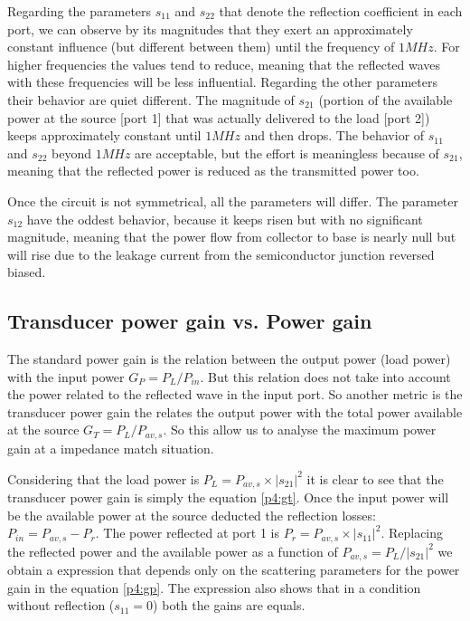 Regarding the parameters $s_{11}$ and $s_{22}$ that denote the reflection coefficient in each port, we can observe by its magnitudes that they exert an approximately constant influence (but different between them) until the frequency of $1 MHz$. For higher frequencies the values tend to reduce, meaning that the reflected waves with these frequencies will be less influential. Regarding the other parameters their behavior are quiet different. The magnitude of $s_{21}$ (portion of the available power at the source [port 1] that was actually delivered to the load [port 2]) keeps approximately constant until $1 MHz$ and then drops. The behavior of $s_{11}$ and $s_{22}$ beyond $1 MHz$ are acceptable, but the effort is meaningless because of $s_{21}$, meaning that the reflected power is reduced as the transmitted power too. 

Once the circuit is not symmetrical, all the parameters will differ. The parameter $s_{12}$ have the oddest behavior, because it keeps risen but with no significant magnitude, meaning that the power flow from collector to base is nearly null but will rise due to the leakage current from the semiconductor junction reversed biased.

\subsection{Transducer power gain vs. Power gain}

The standard power gain is the relation between the output power (load power) with the input power $G_P = P_L/P_{in}$. But this relation does not take into account the power related to the reflected wave in the input port. So another metric is the transducer power gain the relates the output power with the total power available at the source $G_T = P_L/P_{av,s}$. So this allow us to analyse the maximum power gain at a impedance match situation.

Considering that the load power is $P_L = P_{av,s} \times |s_{21}|^2$ it is clear to see that the transducer power gain is simply the equation \ref{p4:gt}. Once the input power will be the available power at the source deducted the reflection losses: $P_{in} = P_{av,s} - P_r$. The power reflected at port 1 is $P_r = P_{av,s} \times |s_{11}|^2$. Replacing the reflected power and the available power as a function of $P_{av,s} = P_L / |s_{21}|^2$ we obtain a expression that depends only on the scattering parameters for the power gain in the equation \ref{p4:gp}. The expression also shows that in a condition without reflection ($s_{11} = 0$) both the gains are equals.

